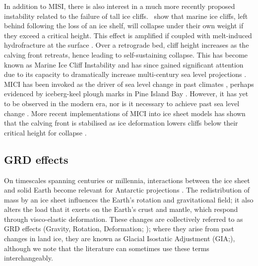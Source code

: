 In addition to MISI, there is also interest in a much more recently proposed instability related to the failure of tall ice cliffs.~\cite{bassisUpperLowerLimits2012} show that marine ice cliffs, left behind following the loss of an ice shelf, will collapse under their own weight if they exceed a critical height. This effect is amplified if coupled with melt-induced hydrofracture at the surface \citep{pollardPotentialAntarcticIce2015}. Over a retrograde bed, cliff height increases as the calving front retreats, hence leading to self-sustaining collapse. This has become known as Marine Ice Cliff Instability and has since gained significant attention due to its capacity to dramatically increase multi-century sea level projections \citep{decontoParisClimateAgreement2021}. MICI has been invoked as the driver of sea level change in past climates \citep{decontoContributionAntarcticaFuture2016}, perhaps evidenced by iceberg-keel plough marks in Pine Island Bay \citep{wiseEvidenceMarineIcecliff2017}. However, it has yet to be observed in the modern era, nor is it necessary to achieve past sea level change \citep{edwardsRevisitingAntarcticIce2019}. More recent implementations of MICI into ice sheet models has shown that the calving front is stabilised as ice deformation lowers cliffs below their critical height for collapse \citep{morlighemWestAntarcticIce2024,sunPotentialMarineIce2026}.

\subsection{GRD effects}

On timescales spanning centuries or millennia, interactions between the ice sheet and solid Earth become relevant for Antarctic projections \citep{whitehouseSolidEarthChange2019}. The redistribution of mass by an ice sheet influences the Earth's rotation and gravitational field; it also alters the load that it exerts on the Earth's crust and mantle, which respond through visco-elastic deformation. These changes are collectively referred to as GRD effects (Gravity, Rotation, Deformation; \citealt{gregoryConceptsTerminologySea2019}); where they arise from past changes in land ice, they are known as Glacial Isostatic Adjustment (GIA;\@ \citealt{gregoryConceptsTerminologySea2019}), although we note that the literature can sometimes use these terms interchangeably.

